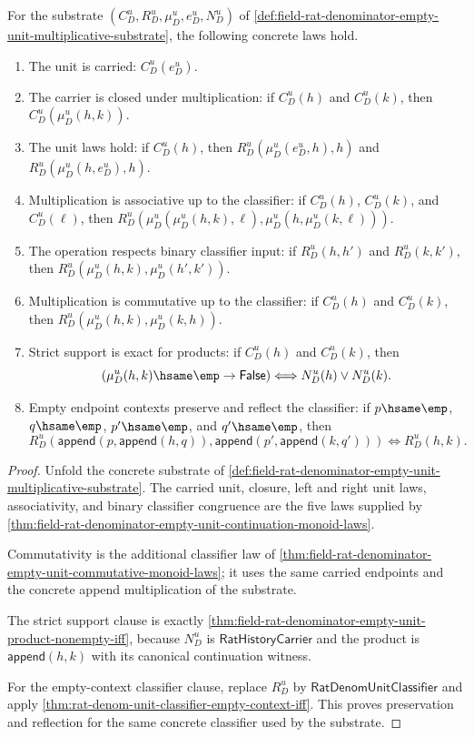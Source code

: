 \begin{theorem}
\label{thm:field-rat-denominator-empty-unit-multiplicative-substrate-laws}
For the substrate
$(C_D^u,R_D^u,\mu_D^u,e_D^u,N_D^u)$ of
\autoref{def:field-rat-denominator-empty-unit-multiplicative-substrate}, the
following concrete laws hold.
\begin{enumerate}
  \item The unit is carried: $C_D^u(e_D^u)$.
  \item The carrier is closed under multiplication: if $C_D^u(h)$ and
  $C_D^u(k)$, then $C_D^u(\mu_D^u(h,k))$.
  \item The unit laws hold: if $C_D^u(h)$, then
  $R_D^u(\mu_D^u(e_D^u,h),h)$ and $R_D^u(\mu_D^u(h,e_D^u),h)$.
  \item Multiplication is associative up to the classifier: if $C_D^u(h)$,
  $C_D^u(k)$, and $C_D^u(\ell)$, then
  $R_D^u(\mu_D^u(\mu_D^u(h,k),\ell),\mu_D^u(h,\mu_D^u(k,\ell)))$.
  \item The operation respects binary classifier input: if $R_D^u(h,h')$ and
  $R_D^u(k,k')$, then $R_D^u(\mu_D^u(h,k),\mu_D^u(h',k'))$.
  \item Multiplication is commutative up to the classifier: if $C_D^u(h)$ and
  $C_D^u(k)$, then $R_D^u(\mu_D^u(h,k),\mu_D^u(k,h))$.
  \item Strict support is exact for products: if $C_D^u(h)$ and $C_D^u(k)$,
  then
  $$
  (\mu_D^u(h,k)\hsame\emp\to\mathsf{False})
  \Longleftrightarrow
  N_D^u(h)\lor N_D^u(k).
  $$
  \item Empty endpoint contexts preserve and reflect the classifier: if
  $p\hsame\emp$, $q\hsame\emp$, $p'\hsame\emp$, and $q'\hsame\emp$, then
  $$
  R_D^u(\mathsf{append}(p,\mathsf{append}(h,q)),
  \mathsf{append}(p',\mathsf{append}(k,q')))
  \Longleftrightarrow
  R_D^u(h,k).
  $$
\end{enumerate}
\end{theorem}
\begin{proof}
Unfold the concrete substrate of
\autoref{def:field-rat-denominator-empty-unit-multiplicative-substrate}. The
carried unit, closure, left and right unit laws, associativity, and binary
classifier congruence are the five laws supplied by
\autoref{thm:field-rat-denominator-empty-unit-continuation-monoid-laws}.

Commutativity is the additional classifier law of
\autoref{thm:field-rat-denominator-empty-unit-commutative-monoid-laws}; it uses
the same carried endpoints and the concrete append multiplication of the
substrate.

The strict support clause is exactly
\autoref{thm:field-rat-denominator-empty-unit-product-nonempty-iff}, because
$N_D^u$ is $\mathsf{RatHistoryCarrier}$ and the product is
$\mathsf{append}(h,k)$ with its canonical continuation witness.

For the empty-context classifier clause, replace $R_D^u$ by
$\mathsf{RatDenomUnitClassifier}$ and apply
\autoref{thm:rat-denom-unit-classifier-empty-context-iff}.
This proves preservation and reflection for the same concrete classifier used
by the substrate.
\end{proof}

